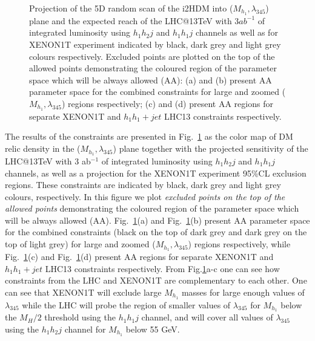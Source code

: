 \documentclass[12pt,a4paper]{article}
\providecommand{\DIFaddtex}[1]{{\protect\color{blue}\uwave{#1}}} %
\providecommand{\DIFaddbegin}{} %
\providecommand{\DIFadd}[1]{\texorpdfstring{\DIFaddtex{#1}}{#1}} %
\begin{document}
\begin{figure}[htb]
\vskip -0.3cm
\caption{Projection of the 5D random scan of the i2HDM into ($M_{h_1},\lambda_{345}$)
plane and the expected  reach of the LHC@13TeV with 3$ab^{-1}$ of integrated luminosity 
using  $h_1 h_2 j$  and  $h_1 h_1 j$ channels as well as for XENON1T experiment
indicated by black,
dark grey and light grey colours respectively.
Excluded points are plotted on the top of the allowed points   demonstrating the coloured region of the parameter space which will be always allowed (AA):
(a) and (b)
present AA parameter space for the combined constraints for 
large and zoomed ($M_{h_1},\lambda_{345}$) regions respectively;
(c) and (d)
present AA regions for separate  XENON1T and $h_1h_1+jet$ LHC13 constraints
respectively.
\label{collider-XENON1T-constraint}} 
\end{figure}
%
The results of the constraints are presented in Fig.~\ref{collider-XENON1T-constraint} as the color map of DM relic density
in the ($M_{h_1},\lambda_{345}$)  plane together with the projected sensitivity of the LHC@13TeV with 3 ab$^{-1}$ of integrated luminosity 
using  $h_1 h_2 j$  and  $h_1 h_1 j$ channels, as well as a projection for the XENON1T experiment
95\%CL exclusion regions. These constraints are indicated by black, dark grey and light grey colours, respectively.
In this figure we plot {\it excluded points on the top of the allowed points}   demonstrating the coloured region of the parameter space which will be always allowed (AA).
Fig.~\ref{collider-XENON1T-constraint}(a) and Fig.~\ref{collider-XENON1T-constraint}(b)
present AA parameter space for the combined constraints (black on the top of dark grey and dark grey on the top of light grey) for 
large and zoomed ($M_{h_1},\lambda_{345}$) regions respectively,
while  Fig.~\ref{collider-XENON1T-constraint}(c) and  Fig.~\ref{collider-XENON1T-constraint}(d)
present AA regions for separate  XENON1T and $h_1h_1+jet$ LHC13 constraints
respectively. From Fig.\ref{collider-XENON1T-constraint}a-c 
one can see how constraints from the LHC and XENON1T are complementary to each other.
One can see that XENON1T will exclude large $M_{h_1}$ masses
for large enough values of  $\lambda_{345}$ while the LHC will probe the region of smaller values of  $\lambda_{345}$ for $M_{h_1}$ below the $M_H/2$ threshold using the
$h_1h_1j$ channel, and will cover all values of $\lambda_{345}$
using the $h_1h_2j$ channel for  $M_{h_1}$ below 55 GeV.

\DIFaddbegin \subsection{\DIFadd{Highlighting the ``always excluded'' regions}}
\end{document}
